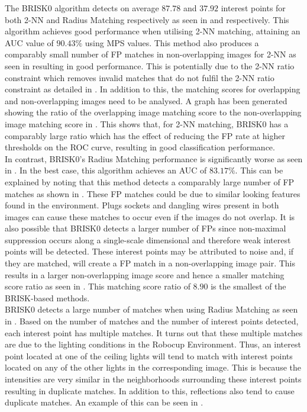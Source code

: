 \documentclass{report}
\begin{document}
The BRISK0 algorithm detects on average $87.78$ and $37.92$ interest points for both 2-NN and Radius Matching respectively as seen in  and  respectively. This algorithm achieves good performance when utilising 2-NN matching, attaining an AUC value of $90.43\%$ using MPS values. This method also produces a comparably small number of FP matches in non-overlapping images for 2-NN as seen in  resulting in good performance. This is potentially due to the 2-NN ratio constraint which removes invalid matches that do not fulfil the 2-NN ratio constraint as detailed in . In addition to this, the matching scores for overlapping and non-overlapping images need to be analysed. A graph has been generated showing the ratio of the overlapping image matching score to the non-overlapping image matching score in . This shows that, for 2-NN matching, BRISK0 has a comparably large ratio which has the effect of reducing the FP rate at higher thresholds on the ROC curve, resulting in good classification performance. \\

In contrast, BRISK0's Radius Matching performance is significantly worse as seen in . In the best case, this algorithm achieves an AUC of $83.17\%$. This can be explained by noting that this method detects a comparably large number of FP matches as shown in . These FP matches could be due to similar looking features found in the environment. Plugs sockets and dangling wires present in both images can cause these matches to occur even if the images do not overlap. It is also possible that BRISK0 detects a larger number of FPs since non-maximal suppression occurs along a single-scale dimensional and therefore weak interest points will be detected. These interest points may be attributed to noise and, if they are matched, will create a FP match in a non-overlapping image pair. This results in a larger non-overlapping image score and hence a smaller matching score ratio as seen in . This matching score ratio of $8.90$ is the smallest of the BRISK-based methods.\\ 

BRISK0 detects a large number of matches when using Radius Matching as seen in . Based on the number of matches and the number of interest points detected, each interest point has multiple matches. It turns out that these multiple matches are due to the lighting conditions in the Robocup Environment. Thus, an interest point located at one of the ceiling lights will tend to match with interest points located on any of the other lights in the corresponding image. This is because the intensities are very similar in the neighborhoods surrounding these interest points resulting in duplicate matches. In addition to this, reflections also tend to cause duplicate matches. An example of this can be seen in .\\
\end{document}
